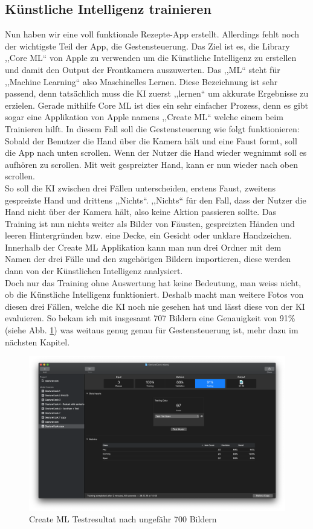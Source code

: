 \documentclass[12pt]{article}
\begin{document}
\subsection{Künstliche Intelligenz trainieren}
Nun haben wir eine voll funktionale Rezepte-App erstellt. Allerdings fehlt noch der wichtigste Teil der App, die Gestensteuerung. Das Ziel ist es, die Library ,,Core ML`` von Apple zu verwenden um die Künstliche Intelligenz zu erstellen und damit den Output der Frontkamera auszuwerten. Das ,,ML`` steht für ,,Machine Learning`` also Maschinelles Lernen. Diese Bezeichnung ist sehr passend, denn tatsächlich muss die KI zuerst ,,lernen`` um akkurate Ergebnisse zu erzielen. Gerade mithilfe Core ML ist dies ein sehr einfacher Prozess, denn es gibt sogar eine Applikation von Apple namens ,,Create ML`` welche einem beim Trainieren hilft. In diesem Fall soll die Gestensteuerung wie folgt funktionieren: Sobald der Benutzer die Hand über die Kamera hält und eine Faust formt, soll die App nach unten scrollen. Wenn der Nutzer die Hand wieder wegnimmt soll es aufhören zu scrollen. Mit weit gespreizter Hand, kann er nun wieder nach oben scrollen. \\ So soll die KI zwischen drei Fällen unterscheiden, erstens Faust, zweitens gespreizte Hand und drittens ,,Nichts``. ,,Nichts`` für den  Fall, dass der Nutzer die Hand nicht über der Kamera hält, also keine Aktion passieren sollte. Das Training ist nun nichts weiter als Bilder von Fäusten, gespreizten Händen und leeren Hintergründen bzw. eine Decke, ein Gesicht oder unklare Handzeichen. Innerhalb der Create ML Applikation kann man nun drei Ordner mit dem Namen der drei Fälle und den zugehörigen Bildern importieren, diese werden dann von der Künstlichen Intelligenz analysiert. \\ Doch nur das Training ohne Auswertung hat keine Bedeutung, man weiss nicht, ob die Künstliche Intelligenz funktioniert. Deshalb macht man weitere Fotos von diesen drei Fällen, welche die KI noch nie gesehen hat und lässt diese von der KI evaluieren. So bekam ich mit insgesamt 707 Bildern eine Genauigkeit von 91\% (siehe Abb. \ref{fig:createML}) was weitaus genug genau für Gestensteuerung ist, mehr dazu im nächsten Kapitel. \cite{gesturecontrolvideo}
\begin{figure}
    \includegraphics[width=\linewidth]{pictures/CreateML.png}
    \caption{Create ML Testresultat nach ungefähr 700 Bildern}
    \label{fig:createML}
\end{figure}
\end{document}

